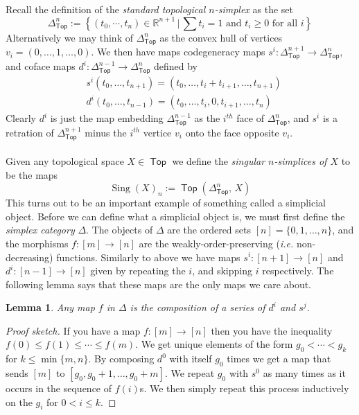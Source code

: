 \documentclass{amsart}
\DeclareMathOperator{\Sing}{Sing}
\DeclareMathOperator{\Top}{\mathsf{Top}}
\newtheorem{lemma}[theorem]{Lemma}
\theoremstyle{definition}
\begin{document}
Recall the definition of the \textit{standard topological $n$-simplex} as the set
$$
\Delta^n_{\Top} := \left\{ (t_0,\cdots, t_n)\in \mathbb{R}^{n+1} \, \Big| \,
  \sum t_i = 1 \text{ and } t_i\geq 0 \text{ for all }i \right\}
$$
Alternatively we may think of $\Delta^n_{\Top}$ as the convex hull of
vertices $v_i=(0,\ldots,1,\ldots,0)$.
We then have maps codegeneracy maps $s^i:\Delta^{n+1}_{\Top} \to \Delta^n_{\Top}$,
and coface maps $d^i: \Delta^{n-1}_{\Top} \to \Delta^n_{\Top}$ defined by
\begin{align*}
  & s^i(t_0,\ldots,t_{n+1}) = (t_0,\ldots,t_i+t_{i+1},\ldots,t_{n+1}) \\
  & d^i(t_0,\ldots,t_{n-1}) = (t_0,\ldots,t_i,0,t_{i+1},\ldots,t_n)
\end{align*}
Clearly $d^i$ is just the map embedding $\Delta^{n-1}_{\Top}$ as the $i^{th}$ face of $\Delta^{n}_{\Top}$, and $s^i$ is a retration of $\Delta^{n+1}_{\Top}$ minus the $i^{th}$ vertice $v_i$ onto
the face opposite $v_i$.
\\
\\
\indent
Given any topological space $X\in\Top$ we define the \textit{singular $n$-simplices of $X$} to be the maps
$$
\Sing(X)_n := \Top( \Delta^n_{\Top},\, X)
$$
This turns out to be an important example of something called a simplicial object.
Before we can define what a simplicial object is, we must first define the
\textit{simplex category} $\Delta$. The objects of $\Delta$ are the ordered sets
$[n]=\{0,1,\ldots,n\}$, and the morphisms $f:[m]\to[n]$ are the
weakly-order-preserving (\textit{i.e.} non-decreasing) functions. Similarly to
above we have maps $s^i:[n+1]\to [n]$ and $d^i:[n-1]\to [n]$ given by
repeating the $i$, and skipping $i$ respectively. The following lemma says
that these maps are the only maps we care about.
\begin{lemma}\label{compos}
  Any map $f$ in $\Delta$ is the composition of a series
  of $d^i$ and $s^j$.
\end{lemma}
\begin{proof}[Proof sketch]
  If you have a map $f:[m]\to[n]$ then you have the inequality $f(0)\leq f(1) \leq \cdots \leq f(m)$.
  We get unique elements of the form $g_0<\cdots < g_k$ for $k\leq \min \{m,n\}$. By composing
  $d^0$ with itself $g_0$ times we get a map that sends $[m]$ to $[g_0,g_0+1,\ldots,g_0+m]$.
  We repeat $g_0$ with $s^0$ as many times as it occurs in the sequence of $f(i)$s. We then simply
  repeat this process inductively on the $g_i$ for $0 < i\leq k$.
\end{proof}
\end{document}
